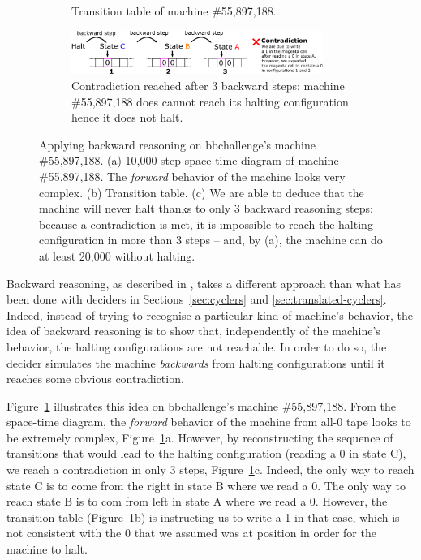 \begin{figure}
\begin{subfigure}[m]{0.45\textwidth}
      
      \caption{Transition table of machine \#55,897,188.}
      
  \end{subfigure}
  
  \begin{subfigure}[m]{1\textwidth}
    \vspace{5ex}
    \centering
    \includegraphics[width=0.9\textwidth]{backward-reasoning.pdf}
    
    \caption{Contradiction reached after 3 backward steps: machine \#55,897,188 does cannot reach its halting configuration hence it does not halt.}
    
\end{subfigure}
  
     \caption{Applying backward reasoning on bbchallenge's machine \#55,897,188. (a) 10,000-step space-time diagram of machine \#55,897,188. The \textit{forward} behavior of the machine looks very complex. (b) Transition table. (c) We are able to deduce that the machine will never halt thanks to only 3 backward reasoning steps: because a contradiction is met, it is impossible to reach the halting configuration in more than 3 steps -- and, by (a), the machine can do at least 20,000 without halting.}
     \label{fig:backward-reasoning}
\end{figure}


Backward reasoning, as described in \cite{Marxen_1998}, takes a different approach than what has been done with deciders in Sections~\ref{sec:cyclers} and \ref{sec:translated-cyclers}. Indeed, instead of trying to recognise a particular kind of machine's behavior, the idea of backward reasoning is to show that, independently of the machine's behavior, the halting configurations are not reachable. In order to do so, the decider simulates the machine \textit{backwards} from halting configurations until it reaches some obvious contradiction. 

Figure~\ref{fig:backward-reasoning} illustrates this idea on bbchallenge's machine \#55,897,188. From the space-time diagram, the \textit{forward} behavior of the machine from all-0 tape looks to be extremely complex, Figure~\ref{fig:backward-reasoning}a. However, by reconstructing the sequence of transitions that would lead to the halting configuration (reading a 0 in state \textcolor{colorC}{C}), we reach a contradiction in only 3 steps, Figure~\ref{fig:backward-reasoning}c. Indeed, the only way to reach state  \textcolor{colorC}{C} is to come from the right in state \textcolor{colorB}{B} where we read a 0. The only way to reach state \textcolor{colorB}{B} is to com from left in state  \textcolor{colorA}{A} where we read a 0. However, the transition table (Figure~\ref{fig:backward-reasoning}b) is instructing us to write a 1 in that case, which is not consistent with the 0 that we assumed was at position in order for the machine to halt.

